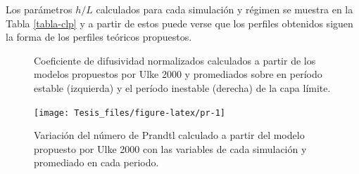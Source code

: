 \documentclass[12pt,spanish,oneside, a4paper]{book}
\begin{document}
Los parámetros \(h/L\) calculados para cada simulación y régimen se
muestra en la Tabla \ref{tabla-clp} y a partir de estos puede verse que
los perfiles obtenidos siguen la forma de los perfiles teóricos
propuestos.

\begin{figure}

{\centering {}\newline{}

}

\caption{Coeficiente de difusividad normalizados calculados a partir de los modelos propuestos por Ulke 2000 y promediados sobre en período estable (izquierda) y el período inestable (derecha) de la capa límite. \label{k-ulke}}\label{fig:k_norm}
\end{figure}

\begin{figure}

{\centering \texttt{[image: Tesis\_files/figure-latex/pr-1]} 

}

\caption{Variación del número de Prandtl calculado a partir del modelo propuesto por Ulke 2000 con las variables de cada simulación y promediado en cada periodo. \label{Pr}}\label{fig:pr}
\end{figure}
\end{document}
